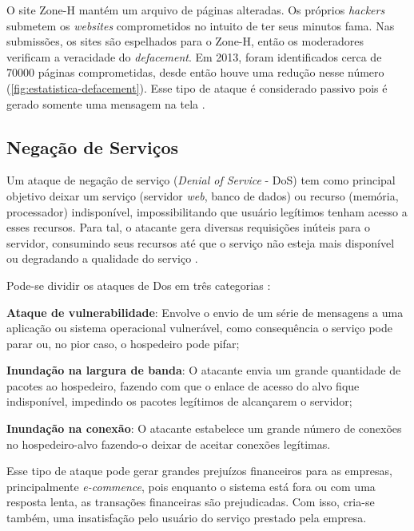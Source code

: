 O site Zone-H mantém um arquivo de páginas alteradas. Os próprios \textit{hackers} submetem os \textit{websites} comprometidos no intuito de ter seus minutos fama. Nas submissões, os sites são espelhados para o Zone-H, então os moderadores verificam a veracidade do \textit{defacement}. Em 2013, foram identificados cerca de 70000 páginas comprometidas, desde então houve uma redução nesse número (\autoref{fig:estatistica-defacement}). Esse tipo de ataque é considerado passivo pois é gerado somente uma mensagem na tela \cite{angelo-xss}.

\subsection{Negação de Serviços} \label{sec:negação}
 
Um ataque de negação de serviço (\textit{Denial of Service} - DoS) tem como principal objetivo deixar um serviço (servidor \textit{web}, banco de dados) ou recurso (memória, processador)  indisponível, impossibilitando que usuário legítimos tenham acesso a esses recursos. Para tal, o atacante gera diversas requisições inúteis para o servidor, consumindo seus recursos até que o serviço não esteja mais disponível ou degradando a qualidade do serviço \cite{cryptsec}.

 Pode-se dividir os ataques de Dos em três categorias \cite{redes:kurose}:

\begin{alineas}
\item \textbf{Ataque de vulnerabilidade}: Envolve o envio de um série de mensagens a uma aplicação ou sistema operacional vulnerável, como consequência o serviço pode parar ou, no pior caso, o hospedeiro pode pifar;
\item \textbf{Inundação na largura de banda}: O atacante envia um grande quantidade de pacotes ao hospedeiro, fazendo com que o enlace de acesso do alvo fique indisponível, impedindo os pacotes legítimos de alcançarem o servidor;
\item \textbf{Inundação na conexão}: O atacante estabelece um grande número de conexões no hospedeiro-alvo fazendo-o deixar de aceitar conexões legítimas.
\end{alineas}

Esse tipo de ataque pode gerar grandes prejuízos financeiros para as empresas, principalmente \textit{e-commence}, pois enquanto o sistema está fora ou com uma resposta lenta, as transações financeiras são prejudicadas. Com isso, cria-se também, uma insatisfação pelo usuário do serviço prestado pela empresa.

